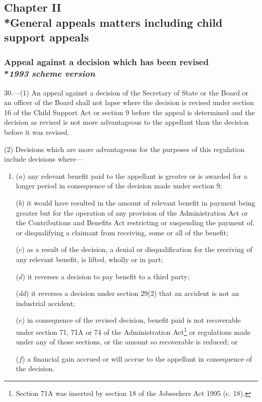 \documentclass[12pt,a4paper]{article}
\begin{document}

\subsection[Chapter II --- General appeals matters including child support appeals]{Chapter II\\*General appeals matters including child support appeals}

\renewcommand\parthead{--- Part IV Chapter II}

\subsubsection[30. Appeal against a decision which has been revised --- \emph{1993 scheme version}]{Appeal against a decision which has been revised\\*\emph{1993 scheme version}}

30.—(1) An appeal against a decision of the Secretary of State
or the Board or an officer of the Board  %
shall not lapse where the decision is revised under section 16 of the Child Support Act or section 9 before the appeal is determined and the decision as revised is not more advantageous to the appellant than the decision before it was revised.

(2) Decisions which are more advantageous for the purposes of this regulation include decisions where—
\begin{enumerate}\item[]
($a$) any relevant benefit paid to the appellant is greater or is awarded for a longer period in consequence of the decision made under section 9;

($b$) it would have resulted in the amount of relevant benefit in payment being greater but for the operation of any provision of the Administration Act or the Contributions and Benefits Act restricting or suspending the payment of, or disqualifying a claimant from receiving, some or all of the benefit;

($c$) as a result of the decision, a denial or disqualification for the receiving of any relevant benefit, is lifted, wholly or in part;

($d$) it reverses a decision to pay benefit to a third party;

($dd$) it reverses a decision under section 29(2) that an accident is not an industrial accident;

($e$) in consequence of the revised decision, benefit paid is not recoverable under section 71, 71A or 74 of the Administration Act\footnote{\frenchspacing Section 71A was inserted by section 18 of the Jobseekers Act 1995 (c. 18).} or regulations made under any of those sections, or the amount so recoverable is reduced; or

($f$) a financial gain accrued or will accrue to the appellant in consequence of the decision.
\end{enumerate}
\end{document}
